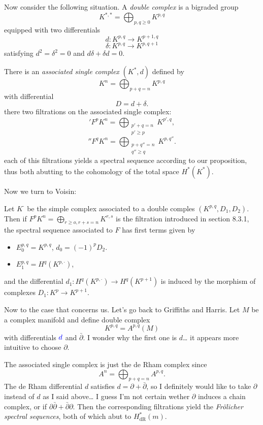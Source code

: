 \begin{definition}
{\color{cyan}Now consider the following situation.} A {\it double complex} is a bigraded group
$$K^{*,*}=\bigoplus_{p,q\geq 0}  K^{p,q}$$
equipped with two differentials
$$d:K^{p,q}\to K^{p+1,q}$$
$$\delta:K^{p,q}\to K^{p,q+1}$$
satisfying $d^2=\delta^2=0$ and $d\delta +\delta d=0$.

There is an {\it associated single complex} $(K^*,d)$ defined by
$$K^n=\bigoplus_{p+q=n} K^{p,q} $$
with differential
$$D=d+\delta.$$
there two filtrations on the associated single complex:
$$'F^pK^n=\bigoplus_{\substack{p'+q=n\\p'\geq p}}K^{p',q},$$
	$$''F^qK^n=\bigoplus_{\substack{p+q''=n\\q''\geq q}}K^{p,q''}.$$
each of this filtrations yields a spectral sequence according to our proposition, thus both abutting to the cohomology of the total space $H^{*}(K^*)$.

Now we turn to Voisin:

\begin{proposition}[Voisin, 8.25]
	Let $K^\cdot$ be the simple complex associated to a double comples $(K^{p,q},D_1,D_2)$. Then if $F^pK^n=\bigoplus_{r\geq o,r+s=n} K^{r,s}$ is the filtration introduced in section 8.3.1, the spectral sequence associated to $F$ has first terms given by
	\begin{itemize}
		\item $E^{p,q}_0=K^{p,q}$, $d_0=(-1)^pD_2$.
		\item $E^{p,q}_1=H^{q}(K^{p,\cdot})$,
	\end{itemize}
	and the differential $d_1:H^{q}(K^{p,\cdot })\to H^{q}(K^{p+1})$ is induced by the morphism of complexes $D_1:K^p\to K^{p+1}$. 

\end{proposition}

{\color{cyan}Now to the case that concerns us. Let's go back to Griffiths and Harris.} Let $M$ be a complex manifold and define double complex
$$K^{p,q}=A^{p,q}(M)$$
with differentials ${\color{blue}d}$ and $\bar\partial$. {\color{blue}I wonder why the first one is $ d$… it appears more intuitive to choose $\partial$.}

The associated single complex is just the de Rham complex since
$$A^{n}=\bigoplus_{p+q=n} A^{p,q}.$$
{\color{blue}The de Rham differential $d$ satisfies $d=\partial+\bar\partial$, so I definitely would like to take $\partial$ instead of $d$ as I said above… I guess I'm not certain wether $\partial$ induces a chain complex, or if $\partial\bar\partial+\bar\partial\partial$}. Then the corresponding filtrations yield the {\it Fr\"olicher spectral sequences}, both of which abut to $H^{*}_{\text{dR}}(m)$.


\end{definition}
